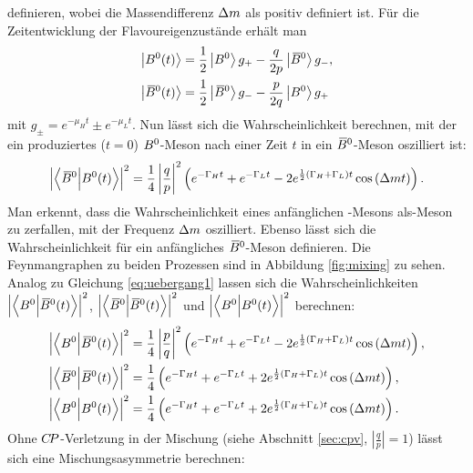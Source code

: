 definieren, wobei die Massendifferenz ${\Delta m}$ als positiv definiert ist. Für die Zeitentwicklung der Flavoureigenzustände erhält man 
\begin{equation}
\begin{split}
\left|{{B}^0}(t)\right>&=\frac{1}{2}\left|{{B}^0}\right>g_+-\frac{q}{2p}\left|{{\kern 0.18em\overline{\kern -0.18em B}{}}{}^0}\right>g_-,\\
\left|{{\kern 0.18em\overline{\kern -0.18em B}{}}{}^0}(t)\right>&=\frac{1}{2}\left|{{\kern 0.18em\overline{\kern -0.18em B}{}}{}^0}\right>g_--\frac{p}{2q}\left|{{B}^0}\right>g_+
\end{split}
\end{equation}
mit $g_\pm=e^{-\mu_Ht}\pm e^{-\mu_Lt}$. Nun lässt sich die Wahrscheinlichkeit berechnen, mit der ein produziertes ($t=0$) ${{B}^0}$-Meson nach einer Zeit $t$ in ein ${{\kern 0.18em\overline{\kern -0.18em B}{}}{}^0}$-Meson oszilliert ist:
\begin{equation}
\left|\left<{{\kern 0.18em\overline{\kern -0.18em B}{}}{}^0}\Big|{{B}^0}(t)\right>\right|^2=\frac{1}{4}\left|\frac{q}{p}\right|^2\left(e^{-\Gamma_Ht}+e^{-\Gamma_Lt}-2e^{\frac{1}{2}\left(\Gamma_H+\Gamma_L\right)t}\cos\left({\Delta m} t\right)\right).\label{eq:uebergang1}
\end{equation}
Man erkennt, dass die Wahrscheinlichkeit eines anfänglichen \Bz-Mesons als\linebreak \Bzb-Meson zu zerfallen, mit der Frequenz ${\Delta m}$ oszilliert. Ebenso lässt sich die Wahrscheinlichkeit für ein anfängliches ${{\kern 0.18em\overline{\kern -0.18em B}{}}{}^0}$-Meson definieren. Die Feynmangraphen zu beiden Prozessen sind in Abbildung \ref{fig:mixing} zu sehen.\\
Analog zu Gleichung \eqref{eq:uebergang1} lassen sich die Wahrscheinlichkeiten $\left|\left<{{B}^0}\Big|{{\kern 0.18em\overline{\kern -0.18em B}{}}{}^0}(t)\right>\right|^2$, $\left|\left<{{\kern 0.18em\overline{\kern -0.18em B}{}}{}^0}\Big|{{\kern 0.18em\overline{\kern -0.18em B}{}}{}^0}(t)\right>\right|^2$ und $\left|\left<{{B}^0}\Big|{{B}^0}(t)\right>\right|^2$ berechnen:
\begin{align}
\left|\left<{{B}^0}\Big|{{\kern 0.18em\overline{\kern -0.18em B}{}}{}^0}(t)\right>\right|^2&=\frac{1}{4}\left|\frac{p}{q}\right|^2\left(e^{-\Gamma_Ht}+e^{-\Gamma_Lt}-2e^{\frac{1}{2}\left(\Gamma_H+\Gamma_L\right)t}\cos\left({\Delta m} t\right)\right),\label{eq:uebergang2}\\
\left|\left<{{\kern 0.18em\overline{\kern -0.18em B}{}}{}^0}\Big|{{\kern 0.18em\overline{\kern -0.18em B}{}}{}^0}(t)\right>\right|^2&=\frac{1}{4}\left(e^{-\Gamma_Ht}+e^{-\Gamma_Lt}+2e^{\frac{1}{2}\left(\Gamma_H+\Gamma_L\right)t}\cos\left({\Delta m} t\right)\right),\label{eq:uebergang3}\\
\left|\left<{{B}^0}\Big|{{B}^0}(t)\right>\right|^2&=\frac{1}{4}\left(e^{-\Gamma_Ht}+e^{-\Gamma_Lt}+2e^{\frac{1}{2}\left(\Gamma_H+\Gamma_L\right)t}\cos\left({\Delta m} t\right)\right).\label{eq:uebergang4}
\end{align}
Ohne ${C\!P}$-Verletzung in der Mischung (siehe Abschnitt \ref{sec:cpv}, $\left|\tfrac{q}{p}\right|=1$) lässt sich eine Mischungsasymmetrie berechnen:

